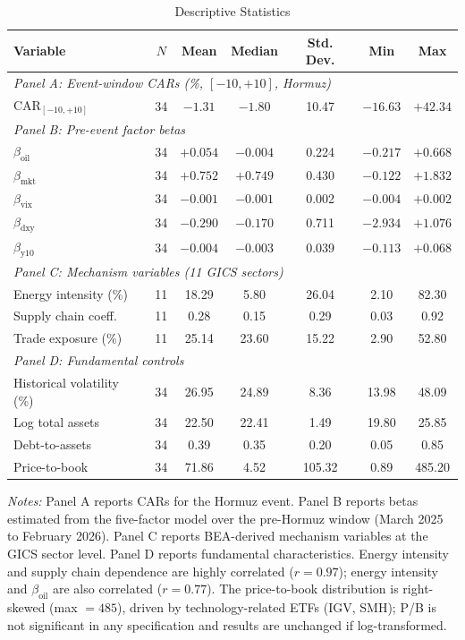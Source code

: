 \documentclass[12pt,preprint,authoryear]{elsarticle}
\begin{document}
\begin{table}[H]
\centering
\caption{Descriptive Statistics}
\label{tab:descriptive}
\begin{threeparttable}
\begin{tabular}{lcccccc}
\toprule
Variable & $N$ & Mean & Median & Std. Dev. & Min & Max \\
\midrule
\multicolumn{7}{l}{\textit{Panel A: Event-window CARs (\%, $[-10, +10]$, Hormuz)}} \\
CAR$_{[-10,+10]}$ & 34 & $-1.31$ & $-1.80$ & 10.47 & $-16.63$ & $+42.34$ \\[4pt]
\multicolumn{7}{l}{\textit{Panel B: Pre-event factor betas}} \\
$\beta_{\text{oil}}$ & 34 & $+0.054$ & $-0.004$ & 0.224 & $-0.217$ & $+0.668$ \\
$\beta_{\text{mkt}}$ & 34 & $+0.752$ & $+0.749$ & 0.430 & $-0.122$ & $+1.832$ \\
$\beta_{\text{vix}}$ & 34 & $-0.001$ & $-0.001$ & 0.002 & $-0.004$ & $+0.002$ \\
$\beta_{\text{dxy}}$ & 34 & $-0.290$ & $-0.170$ & 0.711 & $-2.934$ & $+1.076$ \\
$\beta_{\text{y10}}$ & 34 & $-0.004$ & $-0.003$ & 0.039 & $-0.113$ & $+0.068$ \\[4pt]
\multicolumn{7}{l}{\textit{Panel C: Mechanism variables (11 GICS sectors)}} \\
Energy intensity (\%) & 11 & 18.29 & 5.80 & 26.04 & 2.10 & 82.30 \\
Supply chain coeff. & 11 & 0.28 & 0.15 & 0.29 & 0.03 & 0.92 \\
Trade exposure (\%) & 11 & 25.14 & 23.60 & 15.22 & 2.90 & 52.80 \\[4pt]
\multicolumn{7}{l}{\textit{Panel D: Fundamental controls}} \\
Historical volatility (\%) & 34 & 26.95 & 24.89 & 8.36 & 13.98 & 48.09 \\
Log total assets & 34 & 22.50 & 22.41 & 1.49 & 19.80 & 25.85 \\
Debt-to-assets & 34 & 0.39 & 0.35 & 0.20 & 0.05 & 0.85 \\
Price-to-book & 34 & 71.86 & 4.52 & 105.32 & 0.89 & 485.20 \\
\bottomrule
\end{tabular}
\begin{tablenotes}[flushleft]\footnotesize
\item \textit{Notes:} Panel A reports CARs for the Hormuz event. Panel B reports betas estimated from the five-factor model over the pre-Hormuz window (March 2025 to February 2026). Panel C reports BEA-derived mechanism variables at the GICS sector level. Panel D reports fundamental characteristics. Energy intensity and supply chain dependence are highly correlated ($r = 0.97$); energy intensity and $\beta_{\text{oil}}$ are also correlated ($r = 0.77$). The price-to-book distribution is right-skewed (max $= 485$), driven by technology-related ETFs (IGV, SMH); P/B is not significant in any specification and results are unchanged if log-transformed.
\end{tablenotes}
\end{threeparttable}
\end{table}
\end{document}

